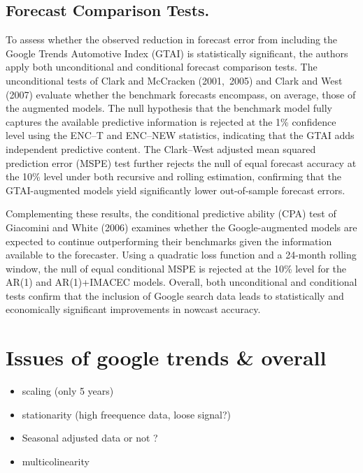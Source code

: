 \documentclass{article}
\begin{document}
\subsection{Forecast Comparison Tests.}
To assess whether the observed reduction in forecast error from including
the Google Trends Automotive Index (GTAI) is statistically significant,
the authors apply both unconditional and conditional forecast comparison
tests.  The unconditional tests of Clark and McCracken (2001,~2005) and
Clark and West (2007) evaluate whether the benchmark forecasts
encompass, on average, those of the augmented models.  The null
hypothesis that the benchmark model fully captures the available
predictive information is rejected at the 1\% confidence level using the
ENC--T and ENC--NEW statistics, indicating that the GTAI adds
independent predictive content.  The Clark--West adjusted mean squared
prediction error (MSPE) test further rejects the null of equal forecast
accuracy at the 10\% level under both recursive and rolling estimation,
confirming that the GTAI-augmented models yield significantly lower
out-of-sample forecast errors.

Complementing these results, the conditional predictive ability (CPA)
test of Giacomini and White (2006) examines whether the Google-augmented
models are expected to continue outperforming their benchmarks given the
information available to the forecaster.  Using a quadratic loss
function and a 24-month rolling window, the null of equal conditional
MSPE is rejected at the 10\% level for the AR(1) and AR(1)+IMACEC
models.  Overall, both unconditional and conditional tests confirm that
the inclusion of Google search data leads to statistically and
economically significant improvements in nowcast accuracy.





\newpage
\section{Issues of google trends \& overall}
\begin{itemize}
    \item scaling (only 5 years)
    \item stationarity (high freequence data, loose signal?)
    \item Seasonal adjusted data or not ?
    \item multicolinearity
\end{itemize}
\end{document}
